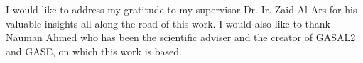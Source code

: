 

\vskip 1cm

I would like to address my gratitude to my supervisor Dr. Ir. Zaid Al-Ars for his valuable insights all along the road of this work. I would also like to thank Nauman Ahmed who has been the scientific adviser and the creator of GASAL2 and GASE, on which this work is based. 





\vskip 2cm
\noindent \AUTHOR \\
\PLACE \\
\DATE

